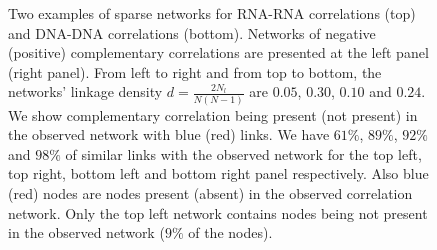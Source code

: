 \documentclass[10pt,a4paper]{article}
\begin{document}
\begin{figure}[h!]
\centering
{}
\caption{\label{fig:sparsenet} Two examples of sparse networks for RNA-RNA correlations (top) and DNA-DNA correlations (bottom). Networks of negative (positive) complementary correlations are presented at the left panel (right panel). From left to right and from top to bottom, the networks' linkage density $d=\frac{2N_{l}}{N(N-1)}$ are $0.05$, $0.30$, $0.10$ and $0.24$. We show complementary correlation being present (not present) in the observed network with blue (red) links. We have $61\%$, $89\%$, $92\%$ and $98\%$ of similar links with the observed network for the top left, top right, bottom left and bottom right panel respectively. Also blue (red) nodes are nodes present (absent) in the observed correlation network. Only the top left network contains nodes being not present in the observed network ($9\%$ of the nodes).}
\end{figure}
\end{document}
